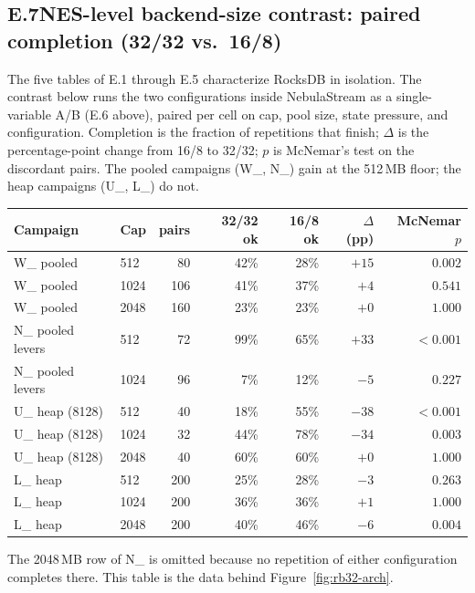 \subsection*{E.7\quad NES-level backend-size contrast: paired completion (32/32 vs.\ 16/8)}
The five tables of E.1 through E.5 characterize RocksDB in isolation.
The contrast below runs the two configurations inside NebulaStream as a single-variable A/B (E.6 above), paired per cell on cap, pool size, state pressure, and configuration.
Completion is the fraction of repetitions that finish; $\Delta$ is the percentage-point change from 16/8 to 32/32; $p$ is McNemar's test on the discordant pairs.
The pooled campaigns (W\_, N\_) gain at the 512\,MB floor; the heap campaigns (U\_, L\_) do not.

\begin{center}
\begin{tabular}{|l|l|r|r|r|r|r|}
\hline
\textbf{Campaign} & \textbf{Cap} & \textbf{pairs} & \textbf{32/32 ok} & \textbf{16/8 ok} & \textbf{$\Delta$ (pp)} & \textbf{McNemar $p$} \\
\hline
W\_ pooled        & 512  & 80  & 42\% & 28\% & $+15$ & $0.002$ \\
\hline
W\_ pooled        & 1024 & 106 & 41\% & 37\% & $+4$  & $0.541$ \\
\hline
W\_ pooled        & 2048 & 160 & 23\% & 23\% & $+0$  & $1.000$ \\
\hline
N\_ pooled levers & 512  & 72  & 99\% & 65\% & $+33$ & $<0.001$ \\
\hline
N\_ pooled levers & 1024 & 96  & 7\%  & 12\% & $-5$  & $0.227$ \\
\hline
U\_ heap (8128)   & 512  & 40  & 18\% & 55\% & $-38$ & $<0.001$ \\
\hline
U\_ heap (8128)   & 1024 & 32  & 44\% & 78\% & $-34$ & $0.003$ \\
\hline
U\_ heap (8128)   & 2048 & 40  & 60\% & 60\% & $+0$  & $1.000$ \\
\hline
L\_ heap          & 512  & 200 & 25\% & 28\% & $-3$  & $0.263$ \\
\hline
L\_ heap          & 1024 & 200 & 36\% & 36\% & $+1$  & $1.000$ \\
\hline
L\_ heap          & 2048 & 200 & 40\% & 46\% & $-6$  & $0.004$ \\
\hline
\end{tabular}
\end{center}
The 2048\,MB row of N\_ is omitted because no repetition of either configuration completes there.
This table is the data behind Figure~\ref{fig:rb32-arch}.

